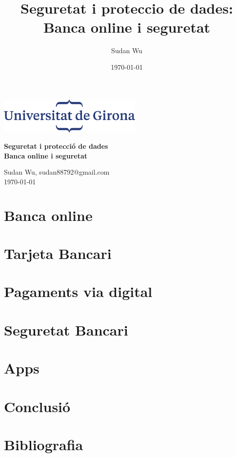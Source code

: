 \documentclass[12pt,a4paper]{article}
\title{Seguretat i proteccio de dades: Banca online i seguretat}
\author{Sudan Wu}
\date{\today}
\begin{document}
\begin{titlepage}
    \begin{center}
        \includegraphics[height=1.8cm]{logoUdG}\\\vfill
    \end{center}
    \center
    {\huge \bfseries Seguretat i protecció de dades}\\[0.5cm]
    {\Huge \bfseries Banca online i seguretat} \\
    \vfill
    \begin{center} \large
        {Sudan Wu, sudan88792@gmail.com} \\[0.25cm]
        {\today}\\ [1cm]
    \end{center}

\end{titlepage}

\tableofcontents


\clearpage
\section{Banca online}

\clearpage
\section{Tarjeta Bancari}


\section{Pagaments via digital}

\clearpage
\section{Seguretat Bancari}

\clearpage
\section{Apps}


\clearpage
\section{Conclusió}


\clearpage
\section{Bibliografia}

\end{document}
